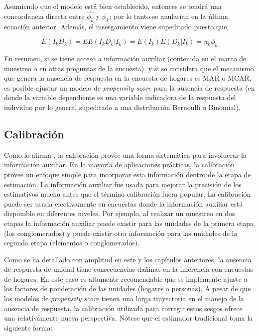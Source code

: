 \documentclass[
  10pt,
  spanish,
]{book}
\begin{document}
Asumiendo que el modelo está bien establecido, entonces se tendrá una concordancia directa entre \(\hat{\phi_k}\) y \(\phi_k\); por lo tanto se anularían en la última ecuación anterior. Además, el insesgamiento viene supeditado puesto que,

\[
E(I_kD_k) 
= EE(I_kD_k|I_k) 
= E(I_k)E(D_k|I_k) = \pi_k \phi_k
\]

En resumen, si se tiene acceso a información auxiliar (contenida en el marco de muestreo o en otras preguntas de la encuesta), y si se considera que el mecanismo que genera la ausencia de respuesta en la encuesta de hogares es MAR o MCAR, es posible ajustar un modelo de \emph{propensity score} para la ausencia de respuesta (en donde la variable dependiente es una variable indicadora de la respuesta del individuo por lo general supeditado a una distribución Bernoulli o Binomial).

\hypertarget{calibraciuxf3n}{%
\subsection{Calibración}\label{calibraciuxf3n}}

Como lo afirma \citet{Sar08}, la calibración provee una forma sistemática para involucrar la información auxiliar. En la mayoría de aplicaciones prácticas, la calibración provee un enfoque simple para incorporar esta información dentro de la etapa de estimación. La información auxiliar fue usada para mejorar la precisión de los estimativos mucho antes que el término calibración fuera popular. La calibración puede ser usada efectivamente en encuestas donde la información auxiliar está disponible en diferentes niveles. Por ejemplo, al realizar un muestreo en dos etapas la información auxiliar puede existir para las unidades de la primera etapa (los conglomerados) y puede existir otra información para las unidades de la segunda etapa (elementos o conglomerados).

Como se ha detallado con amplitud en este y los capítulos anteriores, la ausencia de respuesta de unidad tiene consecuencias dañinas en la inferencia con encuestas de hogares. En este caso es altamente recomendable que se implemente ajuste a los factores de ponderación de las unidades (hogares o personas). A pesar de que los modelos de \emph{propensity score} tienen una larga trayectoria en el manejo de la ausencia de respuesta, la calibración utilizada para corregir estos sesgos ofrece una relativamente nueva perspectiva. Nótese que el estimador tradicional toma la siguiente forma:
\end{document}
